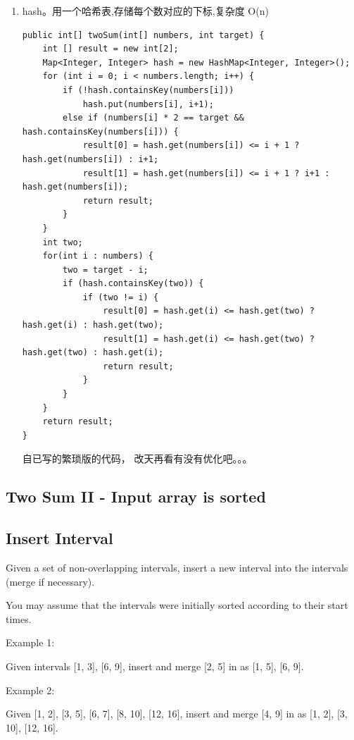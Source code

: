 \documentclass[12pt]{book}
\begin{document}
\begin{enumerate}
\item hash。用一个哈希表,存储每个数对应的下标,复杂度 O(n)
\label{sec-20-1-3-1}

\lstset{language=java,label= ,caption= ,numbers=none}
\begin{lstlisting}
public int[] twoSum(int[] numbers, int target) {
    int [] result = new int[2];
    Map<Integer, Integer> hash = new HashMap<Integer, Integer>();
    for (int i = 0; i < numbers.length; i++) {
        if (!hash.containsKey(numbers[i]))
            hash.put(numbers[i], i+1);
        else if (numbers[i] * 2 == target && hash.containsKey(numbers[i])) {
            result[0] = hash.get(numbers[i]) <= i + 1 ? hash.get(numbers[i]) : i+1;
            result[1] = hash.get(numbers[i]) <= i + 1 ? i+1 : hash.get(numbers[i]);
            return result;
        }
    }
    int two;
    for(int i : numbers) {
        two = target - i;
        if (hash.containsKey(two)) {
            if (two != i) {
                result[0] = hash.get(i) <= hash.get(two) ? hash.get(i) : hash.get(two);
                result[1] = hash.get(i) <= hash.get(two) ? hash.get(two) : hash.get(i);
                return result;
            } 
        }
    }
    return result;
}
\end{lstlisting}

自已写的繁琐版的代码， 改天再看有没有优化吧。。。
\end{enumerate}

\subsection{Two Sum II - Input array is sorted}
\label{sec-20-1-4}
\subsection{Insert Interval}
\label{sec-20-1-5}
Given a set of non-overlapping intervals, insert a new interval into the intervals (merge if necessary).

You may assume that the intervals were initially sorted according to their start times.

Example 1:

Given intervals [1, 3], [6, 9],  insert and merge [2, 5] in as [1, 5], [6, 9].

Example 2:

Given [1, 2], [3, 5], [6, 7], [8, 10], [12, 16],  insert and merge [4, 9] in as [1, 2], [3, 10], [12, 16].
\end{document}
